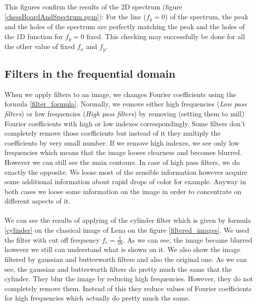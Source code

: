 \documentclass[a4paper]{article}
\begin{document}
        This figures confirm the results of the 2D spectrum (figure \ref{chessBoardAndSpectrum.pgm}): For the line ($f_{y} = 0$) of the spectrum, the peak and the holes of the spectrum are perfectly matching the peak and the holes of the 1D function for $f_{y} = 0$ fixed.  This checking may successfully be done for all the other value of fixed $f_{x}$ and $f_{y}$.\\

		\subsection{Filters in the frequential domain}
When we apply filters to an image, we changes Fourier coefficients using the formula \ref{filter_formula}. Normally, we remove either high frequencies (\textit{Low pass filters}) or low frequencies (\textit{High pass filters}) by removing (setting them to null) Fourier coefficients with high or low indexes correspondingly. Some filters don't completely remove those coefficients but instead of it they multiply the coefficients by very small number. If we remove high indexes, we see only low frequencies which means that the image looses clearness and becomes blurred. However we can still see the main contours. In case of high pass filters, we do exactly the opposite. We loose most of the sensible information however acquire some additional information about rapid drops of color for example. Anyway in both cases we loose some information on the image in order to concentrate on different aspects of it.\\\\
We can see the results of applying of the cylinder filter which is given by formula \ref{cylinder} on the classical image of Lena on the figure \ref{filtered_images}. We used the filter with cut off frequency $f_c = \frac{1}{16}$. As we can see, the image became blurred however we still can understand what is shown on it. We also show the image filtered by gaussian and butterworth filters and also the original one. As we can see, the gaussian and butterworth filters do pretty much the same that the cylinder. They blur the image by reducing high frequencies. However, they do not completely remove them. Instead of this they reduce values of Fourier coefficients for high frequencies which actually do pretty much the same.
\end{document}
